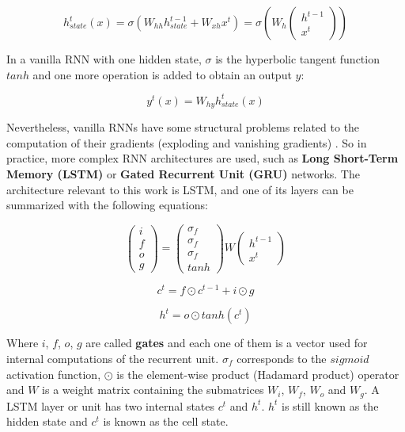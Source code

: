 \begin{equation}
    h_{state}^{t}(x) = \sigma(W_{hh} h_{state}^{t-1} + W_{xh} x^{t}) = \sigma \left(W_{h} \begin{pmatrix} h^{t-1} \\ x^{t} \end{pmatrix} \right)
\end{equation}

In a vanilla RNN with one hidden state, $\sigma$ is the hyperbolic tangent function $tanh$ and one more operation is added to obtain an output $y$:

\begin{equation}
    y^{t}(x) = W_{hy}h_{state}^{t}(x)
\end{equation}

Nevertheless, vanilla RNNs have some structural problems related to the computation of their gradients (exploding and vanishing gradients) \cite{bengio1994learning, pascanu2013difficulty}. So in practice, more complex RNN architectures are used, such as \textbf{Long Short-Term Memory (LSTM)} \cite{hochreiter1997long} or \textbf{Gated Recurrent Unit (GRU)} \cite{cho2014learning} networks. The architecture relevant to this work is LSTM, and one of its layers can be summarized with the following equations:

\begin{equation}
    \begin{pmatrix} i \\ f \\ o \\ g \end{pmatrix} = \begin{pmatrix} \sigma_{f} \\ \sigma_{f} \\ \sigma_{f} \\ tanh \end{pmatrix} W \begin{pmatrix} h^{t-1} \\ x^{t} \end{pmatrix} 
\end{equation}

\begin{equation}
    c^{t} = f \odot c^{t-1} + i \odot g
\end{equation}

\begin{equation}
    h^{t} = o \odot tanh(c^{t})
\end{equation}

Where $i$, $f$, $o$, $g$ are called \textbf{gates} and each one of them is a vector used for internal computations of the recurrent unit. $\sigma_{f}$ corresponds to the $sigmoid$ activation function, $\odot$ is the element-wise product (Hadamard product) operator and $W$ is a weight matrix containing the submatrices $W_{i}$, $W_{f}$, $W_{o}$ and $W_{g}$. A LSTM layer or unit has two internal states $c^{t}$ and $h^{t}$. $h^{t}$ is still known as the hidden state and $c^{t}$ is known as the cell state.

